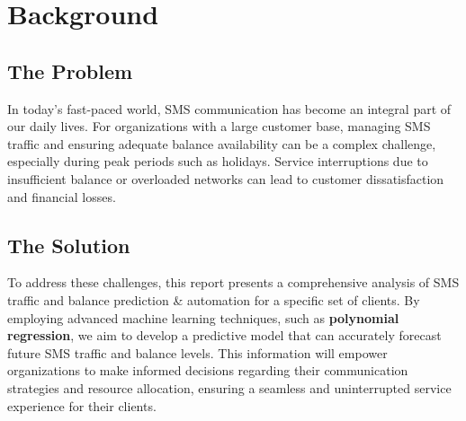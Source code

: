 \documentclass[12pt]{report} %
\begin{document}


















\section*{Background}
\subsection*{The Problem}

In today's fast-paced world, SMS communication has become an integral part of our daily lives. For organizations with a large customer base, managing SMS traffic and ensuring adequate balance availability can be a complex challenge, especially during peak periods such as holidays. Service interruptions due to insufficient balance or overloaded networks can lead to customer dissatisfaction and financial losses.

\subsection*{The Solution}

To address these challenges, this report presents a comprehensive analysis of SMS traffic and balance prediction \& automation for a specific set of clients. By employing advanced machine learning techniques, such as \textbf{polynomial regression}, we aim to develop a predictive model that can accurately forecast future SMS traffic and balance levels. This information will empower organizations to make informed decisions regarding their communication strategies and resource allocation, ensuring a seamless and uninterrupted service experience for their clients.
\end{document}
